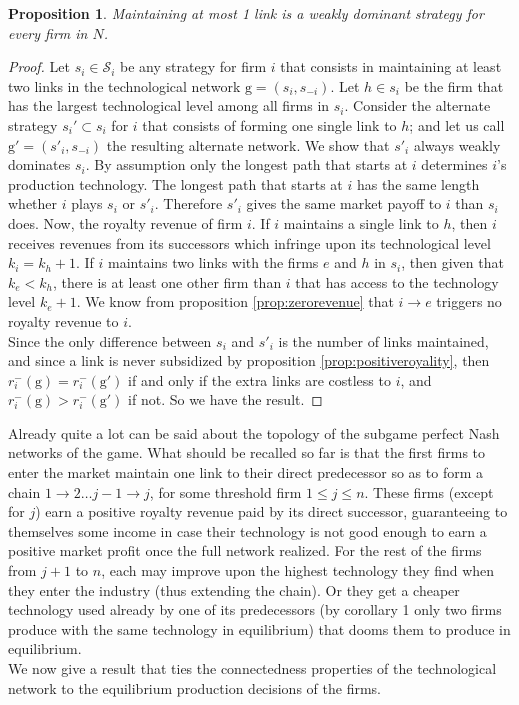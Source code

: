 \documentclass{article}
\newtheorem{proposition}{Proposition}
\begin{document}
\begin{proposition}\label{prop:onelink}
Maintaining at most 1 link is a weakly dominant strategy for every firm in $N$. 
\end{proposition}
\begin{proof}
Let $s_i\in \mathcal{S}_i$ be any strategy for firm $i$ that consists in maintaining at least two links in the technological network $\text{g}=(s_i,s_{-i})$. Let $h\in s_i$ be the firm that has the largest technological level among all firms in $s_i$. Consider the alternate strategy $s_i'\subset s_i$  for $i$ that consists of forming one single link to $h$; and let us call $\text{g}'=(s'_i,s_{-i})$ the resulting alternate network. We show that $s'_i$ always weakly dominates $s_i$. By assumption only the longest path that starts at $i$ determines $i$'s production technology. The longest path that starts at $i$ has the same length whether $i$ plays $s_i$ or $s'_i$. Therefore $s'_i$ gives the same market payoff to $i$ than $s_i$ does.
Now, the royalty revenue of firm $i$. If $i$ maintains a single link to $h$, then $i$ receives revenues from its successors which infringe upon its technological level $k_i=k_h+1$. If $i$ maintains two links with the firms $e$ and $h$ in $s_i$, then given that $k_e<k_h$, there is at least one other firm than $i$ that has access to the technology level $k_e+1$. We know from proposition \ref{prop:zerorevenue} that $i\rightarrow e$ triggers no royalty revenue to $i$. \\
Since the only difference between $s_i$ and $s'_i$ is the number of links maintained, and since a link is never subsidized by proposition \ref{prop:positiveroyality}, then $r_i^-(\text{g}) = {r}_i^{-}(\text{g}')$ if and only if the extra links are costless to $i$, and $r_i^-(\text{g}) > {r}_i^{-}(\text{g}')$ if not. So we have the result. 
\end{proof}
Already quite a lot can be said about the topology of the subgame perfect Nash networks of the game. What should be recalled so far is that the first firms to enter the market maintain one link to their direct predecessor so as to form a chain $1\rightarrow 2 \ldots j-1 \rightarrow j$, for some threshold firm $1\leq j\leq n$. These firms (except for $j$) earn a positive royalty revenue paid by its direct successor, guaranteeing to themselves some income in case their technology is not good enough to earn a positive market profit once the full network realized. For the rest of the firms from $j+1$ to $n$, each may improve upon the highest technology they find when they enter the industry (thus extending the chain). Or they get a cheaper technology used already by one of its predecessors (by corollary 1 only two firms produce with the same technology in equilibrium) that dooms them to produce in equilibrium.\\
\indent We now give a result that ties the connectedness properties of the technological network to the equilibrium production decisions of the firms. \\
 
\end{document}
